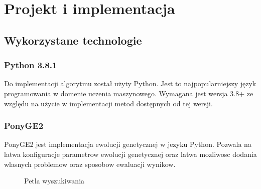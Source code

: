 \chapter{Projekt i implementacja}

\section{Wykorzystane technologie}
\subsection{Python 3.8.1}
Do implementacji algorytmu został użyty Python. Jest to najpopularniejszy język programowania w domenie uczenia maszynowego. Wymagana jest wersja 3.8+ ze względu na użycie w implementacji metod dostępnych od tej wersji.  
\subsection{PonyGE2}
PonyGE2 \cite{Fenton_2017} jest implementacja ewolucji genetycznej w jezyku Python. Pozwala na latwa konfiguracje parametrow ewolucji genetycznej oraz latwa mozliwosc dodania wlasnych problemow oraz sposobow ewaluacji wynikow.

\begin{figure}[h]
	\caption{\label{fig:subcaption_example}Petla wyszukiwania}
\end{figure}

